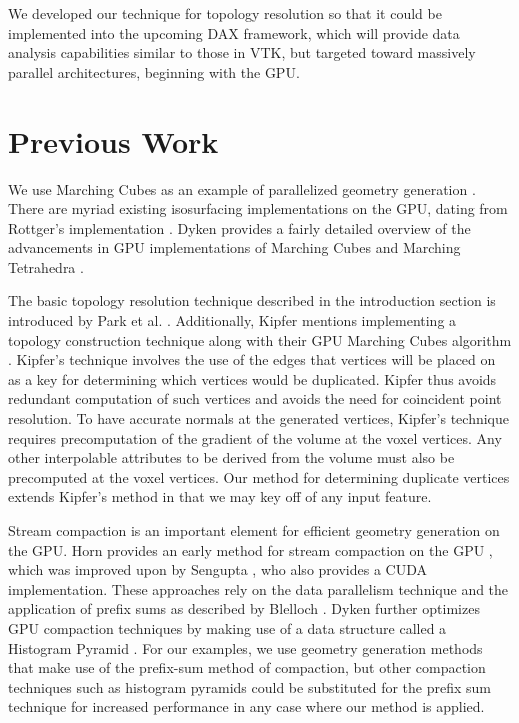 \documentclass[10pt,journal,cspaper,compsoc]{IEEEtran}
\begin{document}
We developed our technique for topology resolution so that it could be implemented
into the upcoming DAX framework, which will provide data analysis capabilities similar to those
in VTK, but targeted toward massively parallel architectures, beginning with the GPU.

\section{Previous Work}

We use Marching Cubes as an example of parallelized geometry 
generation \cite{Lorensen1987}. There are myriad existing isosurfacing implementations on the GPU, dating from 
Rottger's implementation \cite{Rottger2000}. Dyken provides a fairly 
detailed overview of the advancements in GPU implementations of Marching Cubes and 
Marching Tetrahedra \cite{Dyken2008} .

The basic topology resolution technique described in the introduction section is
introduced by Park et al. \cite{Park}. Additionally, Kipfer mentions
implementing a topology construction technique along with their GPU
Marching Cubes algorithm \cite{Kipfer2005}. Kipfer's technique involves the use of the edges that vertices 
will be placed on as a key for determining which vertices would be duplicated. Kipfer 
thus avoids redundant computation of such vertices and avoids the need for coincident 
point resolution. To have accurate normals at the generated vertices, Kipfer's technique
requires precomputation of the gradient of the volume at the voxel vertices. Any other
interpolable attributes to be derived from the volume must also be precomputed at the
voxel vertices. Our method for determining duplicate vertices extends Kipfer's method in that
we may key off of any input feature.

Stream compaction is an important element for efficient geometry generation on the GPU.
Horn provides an early method for stream compaction on the GPU \cite{Horn2005}, which
was improved upon by Sengupta \cite{Sengupta2007}, who also provides a CUDA implementation. 
These approaches rely on the data parallelism technique and the application of prefix sums 
as described by Blelloch \cite{Blelloch1990}. Dyken further optimizes
GPU compaction techniques by making use of a data structure called a Histogram Pyramid \cite{Dyken2008}.
For our examples, we use geometry generation methods that make use of the prefix-sum
method of compaction, but other compaction techniques such as histogram pyramids could be
substituted for the prefix sum technique for increased performance in any case where our method is applied.
\end{document}
